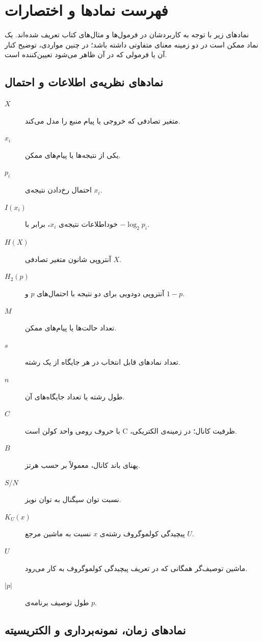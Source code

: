 \chapter*{فهرست نمادها و اختصارات}

نمادهای زیر با توجه به کاربردشان در فرمول‌ها و مثال‌های کتاب تعریف شده‌اند. یک نماد ممکن است در دو زمینه معنای متفاوتی داشته باشد؛ در چنین مواردی، توضیح کنار آن یا فرمولی که در آن ظاهر می‌شود تعیین‌کننده است.

\section*{نمادهای نظریه‌ی اطلاعات و احتمال}

\begin{description}
  \item[\(X\)] متغیر تصادفی که خروجی یا پیام منبع را مدل می‌کند.
  \item[\(x_i\)] یکی از نتیجه‌ها یا پیام‌های ممکن.
  \item[\(p_i\)] احتمال رخ‌دادن نتیجه‌ی \(x_i\).
  \item[\(I(x_i)\)] خوداطلاعات نتیجه‌ی \(x_i\)، برابر با \(-\log_2 p_i\).
  \item[\(H(X)\)] آنتروپی شانون متغیر تصادفی \(X\).
  \item[\(H_2(p)\)] آنتروپی دودویی برای دو نتیجه با احتمال‌های \(p\) و \(1-p\).
  \item[\(M\)] تعداد حالت‌ها یا پیام‌های ممکن.
  \item[\(s\)] تعداد نمادهای قابل انتخاب در هر جایگاه از یک رشته.
  \item[\(n\)] طول رشته یا تعداد جایگاه‌های آن.
  \item[\(C\)] ظرفیت کانال؛ در زمینه‌ی الکتریکی، \(\mathrm{C}\) با حروف رومی واحد کولن است.
  \item[\(B\)] پهنای باند کانال، معمولاً بر حسب هرتز.
  \item[\(S/N\)] نسبت توان سیگنال به توان نویز.
  \item[\(K_U(x)\)] پیچیدگی کولموگروف رشته‌ی \(x\) نسبت به ماشین مرجع \(U\).
  \item[\(U\)] ماشین توصیف‌گر همگانی که در تعریف پیچیدگی کولموگروف به کار می‌رود.
  \item[\(|p|\)] طول توصیف برنامه‌ی \(p\).
\end{description}

\section*{نمادهای زمان، نمونه‌برداری و الکتریسیته}

